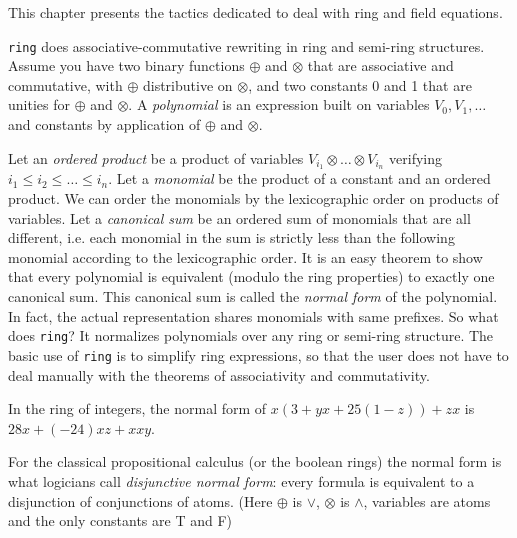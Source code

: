 \label{ring}

This chapter presents the tactics dedicated to deal with ring and
field equations.



\texttt{ring} does associative-commutative rewriting in ring and semi-ring
structures. Assume you have two binary functions $\oplus$ and $\otimes$
that are associative and commutative, with $\oplus$ distributive on
$\otimes$, and two constants 0 and 1 that are unities for $\oplus$ and
$\otimes$. A \textit{polynomial} is an expression built on variables $V_0, V_1,
\dots$ and constants by application of $\oplus$ and $\otimes$.

Let an {\it ordered product} be a product of variables $V_{i_1}
\otimes \ldots \otimes V_{i_n}$ verifying $i_1 \le i_2 \le \dots \le
i_n$. Let a \textit{monomial} be the product of a constant and an
ordered product.  We can order the monomials by the lexicographic
order on products of variables. Let a \textit{canonical sum} be an
ordered sum of monomials that are all different, i.e. each monomial in
the sum is strictly less than the following monomial according to the
lexicographic order. It is an easy theorem to show that every
polynomial is equivalent (modulo the ring properties) to exactly one
canonical sum. This canonical sum is called the \textit{normal form}
of the polynomial. In fact, the actual representation shares monomials
with same prefixes. So what does \texttt{ring}? It normalizes
polynomials over any ring or semi-ring structure. The basic use of
\texttt{ring} is to simplify ring expressions, so that the user does
not have to deal manually with the theorems of associativity and
commutativity.

\begin{Examples}
\item In the ring of integers, the normal form of 
$x (3 + yx + 25(1 - z)) + zx$ is $28x + (-24)xz + xxy$.
\item For the classical propositional calculus (or the boolean rings)
  the normal form is what logicians call \textit{disjunctive normal
    form}: every formula is equivalent to a disjunction of
  conjunctions of atoms. (Here $\oplus$ is $\vee$, $\otimes$ is
  $\wedge$, variables are atoms and the only constants are T and F)
\end{Examples}


